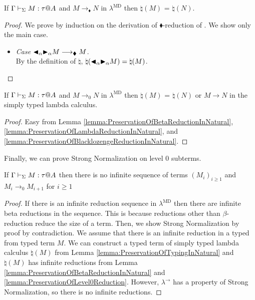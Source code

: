 \begin{lemma}
    \label{lemma:PreservationOfBlacklozengeReductionInNatural}
    If $\G \V M:\tau@A$ and $M \longrightarrow_\blacklozenge N$ in $\lambda^{\text{MD}}$
    then $\natural(M)$ =  $\natural(N)$.
\end{lemma}

\begin{proof}
    We prove by induction on the derivation of $\blacklozenge$-reduction of \LMD.
    We show only the main case.
    \begin{itemize}
        \item \textit{Case} \( {\mathop{\blacktriangleleft}}_\alpha {\mathop{\blacktriangleright}}_\alpha M \longrightarrow_\blacklozenge M \).\\
            By the definition of $\natural$, \(\natural({\mathop{\blacktriangleleft}}_\alpha {\mathop{\blacktriangleright}}_\alpha M) = \natural(M)\).
    \end{itemize}
\end{proof}

\begin{lemma}
    \label{lemma:PreservationOfLevel0Reduction}
    If $\G \V M:\tau@A$ and $M \longrightarrow_0 N$ in $\lambda^{\text{MD}}$
    then $\natural(M)$ =  $\natural(N)$ or \( M \longrightarrow N \) in the simply typed lambda calculus.
\end{lemma}

\begin{proof}
    Easy from Lemma \ref{lemma:PreservationOfBetaReductionInNatural},
    \ref{lemma:PreservationOfLambdaReductionInNatural}, and
    \ref{lemma:PreservationOfBlacklozengeReductionInNatural}.
\end{proof}

Finally, we can prove Strong Normalization on level 0 subterms.

\begin{lemma}
    \label{lemma:StrongNormalizationofLevel0Reduction}
    If \( \G\V M:\tau@A \) then there is no infinite sequence of terms $(M_i)_{i\ge1}$ and $M_i \longrightarrow_{0} M_{i+1}$ for $i\ge 1$
\end{lemma}

\begin{proof}
    If there is an infinite reduction sequence in $\lambda^{\text{MD}}$ then
    there are infinite beta reductions in the sequence.  This is because
    reductions other than $\beta$-reduction reduce the size of a term.  Then,
    we show Strong Normalization by proof by contradiction.  We assume that
    there is an infinite reduction in a typed \LMD from typed term $M$.  We can
    construct a typed term of simply typed lambda calculus $\natural(M)$ from
    Lemma \ref{lemma:PreservationOfTypingInNatural} and $\natural(M)$ has
    infinite reductions from Lemma \ref{lemma:PreservationOfBetaReductionInNatural}
    and \ref{lemma:PreservationOfLevel0Reduction}. However, $\lambda^\to$ has a
    property of Strong Normalization, so there is no infinite reductions.
\end{proof}

